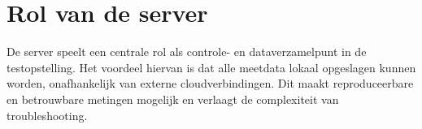 \section{Rol van de server}

De server speelt een centrale rol als controle- en dataverzamelpunt in de testopstelling. Het voordeel hiervan is dat alle meetdata lokaal opgeslagen kunnen worden, onafhankelijk van externe cloudverbindingen. Dit maakt reproduceerbare en betrouwbare metingen mogelijk en verlaagt de complexiteit van troubleshooting.


